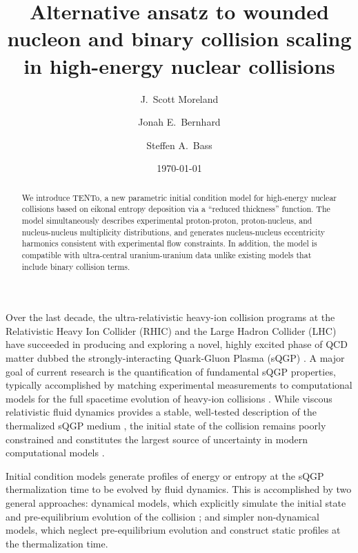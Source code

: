 \documentclass[aps,prc,reprint,amsmath]{revtex4-1}
\newcommand{\psec}[1]{\phantomsection\addcontentsline{toc}{section}{#1}}
\newcommand{\trento}{T\raisebox{-.5ex}{R}ENTo}
\begin{document}
\title{Alternative ansatz to wounded nucleon and binary collision scaling \\ in high-energy nuclear collisions}

\author{J.\ Scott Moreland}
\author{Jonah E.\ Bernhard}
\author{Steffen A.\ Bass}

\date{\today}


\begin{abstract}
  We introduce \trento, a new parametric initial condition model for high-energy nuclear collisions based on eikonal entropy deposition via a ``reduced thickness'' function.
  The model simultaneously describes experimental proton-proton, proton-nucleus, and nucleus-nucleus multiplicity distributions, and generates nucleus-nucleus eccentricity harmonics consistent with experimental flow constraints.
  In addition, the model is compatible with ultra-central uranium-uranium data unlike existing models that include binary collision terms.
\end{abstract}


\maketitle

\psec{Introduction}

Over the last decade, the ultra-relativistic heavy-ion collision programs at the Relativistic Heavy Ion Collider (RHIC) and the Large Hadron Collider (LHC) have succeeded in producing and exploring a novel, highly excited phase of QCD matter dubbed the strongly-interacting Quark-Gluon Plasma (sQGP)
\cite{Arsene:2004fa,Adcox:2004mh,Back:2004je,Adams:2005dq,Gyulassy:2004zy,Muller:2006ee,Muller:2012zq}.
A major goal of current research is the quantification of fundamental sQGP properties, typically accomplished by matching experimental measurements to computational models for the full spacetime evolution of heavy-ion collisions \cite{Petersen:2010zt,Novak:2013bqa}.
While viscous relativistic fluid dynamics provides a stable, well-tested description of the thermalized sQGP medium \cite{Baier:2006gy,Song:2007ux,Luzum:2008cw,Schenke:2010rr,Shen:2011eg,Shen:2014vra}, the initial state of the collision remains poorly constrained and constitutes the largest source of uncertainty in modern computational models \cite{Song:2010mg, Retinskaya:2013gca}.

Initial condition models generate profiles of energy or entropy at the sQGP thermalization time to be evolved by fluid dynamics.
This is accomplished by two general approaches:
dynamical models, which explicitly simulate the initial state and pre-equilibrium evolution of the collision \cite{Schenke:2012wb,vanderSchee:2013pia,Berges:2014yta,Kurkela:2014tea};
and simpler non-dynamical models, which neglect pre-equilibrium evolution and construct static profiles at the thermalization time.
\end{document}
